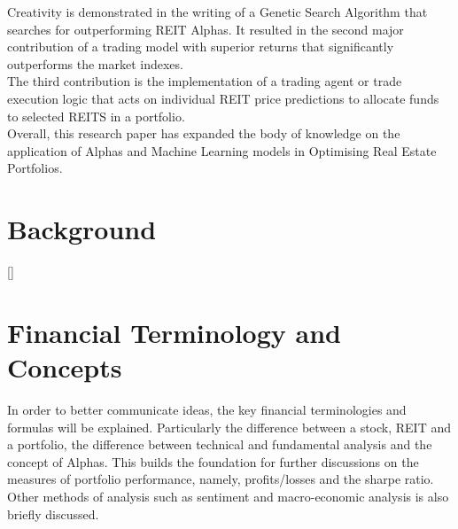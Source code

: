 \documentclass[a4paper,12pt]{report}
\renewcommand\thechapter{\Roman{chapter}}
\numberwithin{equation}{section}
\theoremstyle{definition}
\begin{document}
Creativity is demonstrated in the writing of a Genetic Search Algorithm that searches for outperforming REIT Alphas. It resulted in the second major contribution of a trading model with superior returns that significantly outperforms the market indexes.\\ 

The third contribution is the implementation of a trading agent or trade execution logic that acts on individual REIT price predictions to allocate funds to selected REITS in a portfolio.\\

Overall, this research paper has expanded the body of knowledge on the application of Alphas and Machine Learning models in Optimising Real Estate Portfolios.

\titleformat{\chapter}[block]
  {\normalfont\huge\bfseries}{\thechapter.}{1em}{\Huge\centering}
\titlespacing*{\chapter}{0pt}{150pt}{0pt}
\setcounter{chapter}{0}
\renewcommand{\thechapter}{\Roman{chapter}}
\chapter{Background}


\titleformat{\chapter}[display]{\Large}{\centering
  \MakeUppercase{\chaptername}\quad{\Huge\thechapter}}{10pt}{\titlerule[.5pt]\vspace{10pt}\centering
  \MakeUppercase}[\vspace{10pt}{\titlerule[.5pt]}]%
\titlespacing{\chapter}{0pt}{-80pt}{1cm}%
\renewcommand{\thechapter}{\arabic{chapter}}

\chapter{Financial Terminology and Concepts}
In order to better communicate ideas, the key financial terminologies and formulas will be explained. Particularly the difference between a stock, REIT and a portfolio, the difference between technical and fundamental analysis and the concept of Alphas. This builds the foundation for further discussions on the measures of portfolio performance, namely, profits/losses and the sharpe ratio. Other methods of analysis such as sentiment and macro-economic analysis is also briefly discussed. 
\end{document}
